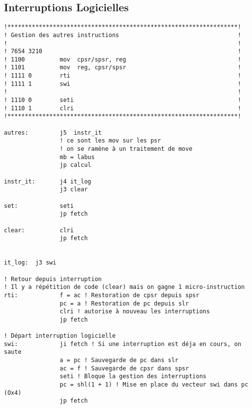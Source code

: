 \documentclass{myArticle}
\begin{document}
\subsection{Interruptions Logicielles}
\begin{lstlisting}
!******************************************************************!
! Gestion des autres instructions                                  !
!                                                                  !
! 7654 3210                                                        !
! 1100          mov  cpsr/spsr, reg                                !
! 1101          mov  reg, cpsr/spsr                                !
! 1111 0        rti                                                !
! 1111 1        swi                                                !
!                                                                  !
! 1110 0        seti                                               !
! 1110 1        clri                                               !
!******************************************************************!

autres:         j5  instr_it
                ! ce sont les mov sur les psr
                ! on se ramène à un traitement de move
                mb = labus
                jp calcul

instr_it:       j4 it_log
                j3 clear

set:            seti
                jp fetch

clear:          clri
                jp fetch


it_log:  j3 swi

! Retour depuis interruption
! Il y a répétition de code (clear) mais on gagne 1 micro-instruction
rti:            f = ac ! Restoration de cpsr depuis spsr
                pc = a ! Restoration de pc depuis slr
                clri ! autorise à nouveau les interruptions
                jp fetch

! Départ interruption logicielle
swi:            ji fetch ! Si une interruption est déja en cours, on saute
                a = pc ! Sauvegarde de pc dans slr
                ac = f ! Sauvegarde de cpsr dans spsr
                seti ! Bloque la gestion des interruptions
                pc = shl(1 + 1) ! Mise en place du vecteur swi dans pc (Ox4)
                jp fetch
\end{lstlisting}

\newpage
\end{document}
